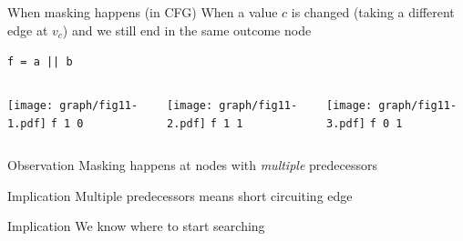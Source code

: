 \documentclass[xcolor = {dvipsnames, table}, aspectratio=169]{beamer}
\begin{document}
\begin{frame}[fragile]
    \begin{block}{When masking happens (in CFG)}
        When a value $c$ is changed (taking a different edge at $v_c$) and
        we still end in the same outcome node
    \end{block}

    \lstinline{f = a || b}

    \begin{columns}
        \begin{column}{0.3\textwidth}
            \centering
            \texttt{[image: graph/fig11-1.pdf]}
            \lstinline{f 1 0}
        \end{column}

        \begin{column}{0.3\textwidth}
            \centering
            \texttt{[image: graph/fig11-2.pdf]}
            \lstinline{f 1 1}
        \end{column}

        \begin{column}{0.3\textwidth}
            \centering
            \texttt{[image: graph/fig11-3.pdf]}
        \lstinline{f 0 1}
        \end{column}
    \end{columns}
\end{frame}

\begin{frame}
    \begin{block}{Observation}
        Masking happens at nodes with \emph{multiple} predecessors
    \end{block}

    \begin{block}{Implication}
        Multiple predecessors means short circuiting edge
    \end{block}

    \begin{block}{Implication}
        We know where to start searching
    \end{block}
\end{frame}
\end{document}
